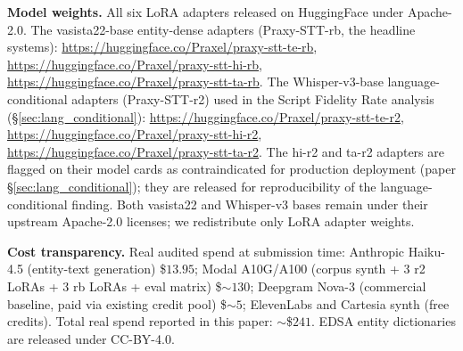 \documentclass[conference,a4paper]{IEEEtran}
\begin{document}
\textbf{Model weights.} All six LoRA adapters released on HuggingFace under Apache-2.0. The vasista22-base entity-dense adapters (Praxy-STT-rb, the headline systems): \url{https://huggingface.co/Praxel/praxy-stt-te-rb}, \url{https://huggingface.co/Praxel/praxy-stt-hi-rb}, \url{https://huggingface.co/Praxel/praxy-stt-ta-rb}. The Whisper-v3-base language-conditional adapters (Praxy-STT-r2) used in the Script Fidelity Rate analysis (\S\ref{sec:lang_conditional}): \url{https://huggingface.co/Praxel/praxy-stt-te-r2}, \url{https://huggingface.co/Praxel/praxy-stt-hi-r2}, \url{https://huggingface.co/Praxel/praxy-stt-ta-r2}. The hi-r2 and ta-r2 adapters are flagged on their model cards as contraindicated for production deployment (paper \S\ref{sec:lang_conditional}); they are released for reproducibility of the language-conditional finding. Both vasista22 and Whisper-v3 bases remain under their upstream Apache-2.0 licenses; we redistribute only LoRA adapter weights.

\textbf{Cost transparency.} Real audited spend at submission time: Anthropic Haiku-4.5 (entity-text generation) \$$13.95$; Modal A10G/A100 (corpus synth + 3 r2 LoRAs + 3 rb LoRAs + eval matrix) \$$\sim 130$; Deepgram Nova-3 (commercial baseline, paid via existing credit pool) \$$\sim 5$; ElevenLabs and Cartesia synth (free credits). Total real spend reported in this paper: $\sim$\$$241$. EDSA entity dictionaries are released under CC-BY-4.0.



\end{document}
